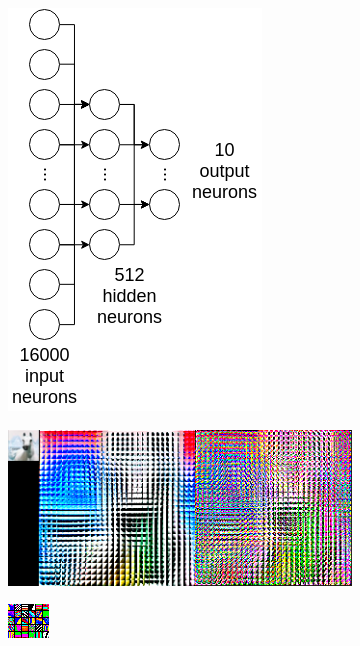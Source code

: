 \documentclass{article} %
\begin{document}
    \begin{figure}
        \centering
        \begin{subfigure}{.35\linewidth}
            \centering
            \includegraphics[width=.5\linewidth]{images/neural-architecture.png}
            \caption{}
        \end{subfigure}
        \begin{subfigure}{.43\linewidth}
            \centering
            \includegraphics[width=.75\linewidth]{images/normalize-zca.png}
        \caption{}
        \end{subfigure}
        \begin{subfigure}{.2\linewidth}
            \centering
            \includegraphics[width=\linewidth]{images/patch-clusters-few.png}

\end{subfigure}
\end{figure}
\end{document}
